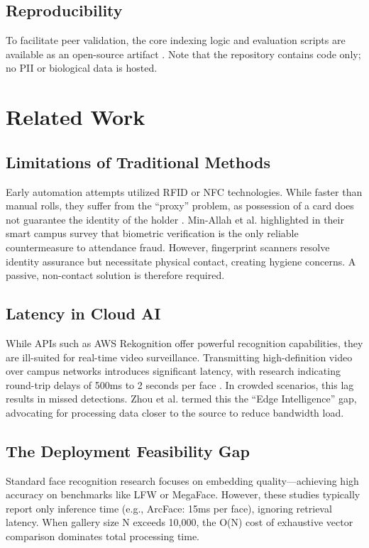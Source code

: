 \documentclass[conference]{IEEEtran}
\begin{document}
\subsection{Reproducibility}
To facilitate peer validation, the core indexing logic and evaluation scripts are available as an open-source artifact \cite{scholarmaster_repo}. Note that the repository contains code only; no PII or biological data is hosted.

\section{Related Work}

\subsection{Limitations of Traditional Methods}
Early automation attempts utilized RFID or NFC technologies. While faster than manual rolls, they suffer from the ``proxy'' problem, as possession of a card does not guarantee the identity of the holder \cite{b1}. Min-Allah et al. \cite{b8} highlighted in their smart campus survey that biometric verification is the only reliable countermeasure to attendance fraud. However, fingerprint scanners resolve identity assurance but necessitate physical contact, creating hygiene concerns. A passive, non-contact solution is therefore required.

\subsection{Latency in Cloud AI}
While APIs such as AWS Rekognition offer powerful recognition capabilities, they are ill-suited for real-time video surveillance. Transmitting high-definition video over campus networks introduces significant latency, with research indicating round-trip delays of 500ms to 2 seconds per face \cite{b9}. In crowded scenarios, this lag results in missed detections. Zhou et al. \cite{b2} termed this the ``Edge Intelligence'' gap, advocating for processing data closer to the source to reduce bandwidth load. 

\subsection{The Deployment Feasibility Gap}
Standard face recognition research focuses on embedding quality—achieving high accuracy on benchmarks like LFW or MegaFace. However, these studies typically report only inference time (e.g., ArcFace: 15ms per face), ignoring retrieval latency. When gallery size N exceeds 10,000, the O(N) cost of exhaustive vector comparison dominates total processing time.
\end{document}
